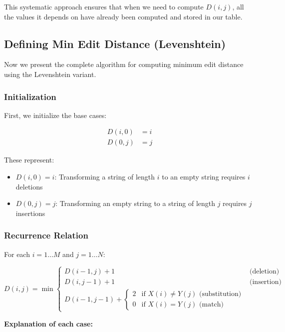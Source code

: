 \documentclass[11pt,a4paper]{article}
\theoremstyle{definition}
\theoremstyle{plain}
\theoremstyle{remark}
\begin{document}
This systematic approach ensures that when we need to compute $D(i,j)$, all the values it depends on have already been computed and stored in our table.

\subsection{Defining Min Edit Distance (Levenshtein)}

Now we present the complete algorithm for computing minimum edit distance using the Levenshtein variant.

\subsubsection{Initialization}

First, we initialize the base cases:

\begin{align*}
D(i,0) &= i \\
D(0,j) &= j
\end{align*}

These represent:
\begin{itemize}
    \item $D(i,0) = i$: Transforming a string of length $i$ to an empty string requires $i$ deletions
    \item $D(0,j) = j$: Transforming an empty string to a string of length $j$ requires $j$ insertions
\end{itemize}

\subsubsection{Recurrence Relation}

For each $i = 1 \ldots M$ and $j = 1 \ldots N$:

\[
D(i,j) = \min \begin{cases}
D(i-1,j) + 1 & \text{(deletion)} \\
D(i,j-1) + 1 & \text{(insertion)} \\
D(i-1,j-1) + \begin{cases}
2 & \text{if } X(i) \neq Y(j) \text{ (substitution)} \\
0 & \text{if } X(i) = Y(j) \text{ (match)}
\end{cases}
\end{cases}
\]

\textbf{Explanation of each case:}
\end{document}
